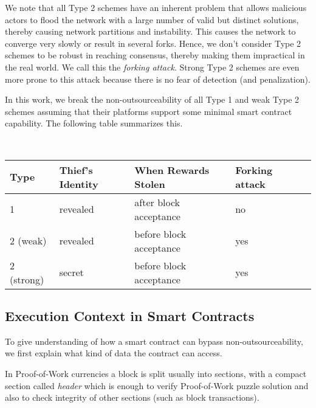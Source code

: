 \documentclass[11pt]{article}
\begin{document}
We note that all Type 2 schemes have an inherent problem that allows malicious actors to flood the network with a large number of valid but distinct solutions, thereby causing network partitions and instability. This causes the network to converge very slowly or result in several forks. Hence, we don't consider Type 2 schemes to be robust in reaching consensus, thereby making them impractical in the real world. We call this the {\em forking attack}. Strong Type 2 schemes are even more prone to this attack because there is no fear of detection (and penalization).

In this work, we break the non-outsourceability of all Type 1 and weak Type 2 schemes assuming that their platforms support
some minimal smart contract capability. The following table summarizes this. 

~\\
	\begin{tabular}{lllll}
		  Type     & Thief's Identity   & When Rewards Stolen       & Forking attack  \\\hline
		  1        & revealed              & after block acceptance   & no             \\
		  2 (weak)   & revealed           & before block acceptance  & yes            \\
		  2 (strong) & secret           & before block acceptance  & yes            
	\end{tabular}


\subsection{Execution Context in Smart Contracts}

To give understanding of how a smart contract can bypass non-outsourceability, we first explain what kind of data the contract
can access.

In Proof-of-Work currencies a block is split usually into sections, with a compact section called {\em header} which is
enough to verify Proof-of-Work puzzle solution and also to check integrity of other sections (such as block transactions).
\end{document}
